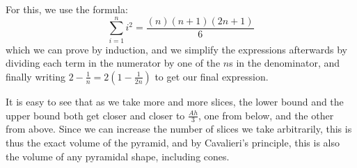 \documentclass{article}
\begin{document}
For this, we use the formula:
\[ \sum_{i=1}^{n} i^2 = \frac{(n)(n+1)(2n+1)}{6} \]
which we can prove by induction, and we simplify the expressions afterwards by dividing each term
in the numerator by one of the $n$s in the denominator, and finally writing $2-\frac{1}{n} = 2(1-\frac{1}{2n})$ 
to get our final expression.

It is easy to see that as we take more and more slices, the lower bound and the upper bound both
get closer and closer to $\frac{Ah}{3}$, one from below, and the other from above. Since we can
increase the number of slices we take arbitrarily, this is thus the exact volume of the pyramid,
and by Cavalieri's principle, this is also the volume of any pyramidal shape, including cones.
\end{document}
